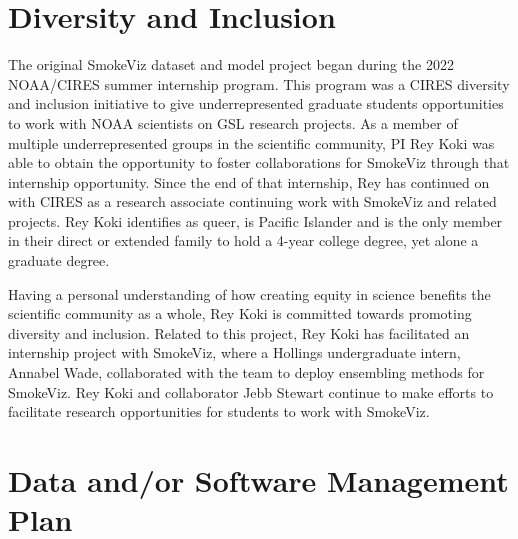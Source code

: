 \section{Diversity and Inclusion}

The original SmokeViz dataset and model project began during the 2022 NOAA/CIRES summer internship program. This program was a CIRES diversity and inclusion initiative to give underrepresented graduate students opportunities to work with NOAA scientists on GSL research projects. As a member of multiple underrepresented groups in the scientific community, PI Rey Koki was able to obtain the opportunity to foster collaborations for SmokeViz through that internship opportunity. Since the end of that internship, Rey has continued on with CIRES as a research associate continuing work with SmokeViz and related projects. Rey Koki identifies as queer, is Pacific Islander and is the only member in their direct or extended family to hold a 4-year college degree, yet alone a graduate degree. 

Having a personal understanding of how creating equity in science benefits the scientific community as a whole, Rey Koki is committed towards promoting diversity and inclusion. Related to this project, Rey Koki has facilitated an internship project with SmokeViz, where a Hollings undergraduate intern, Annabel Wade, collaborated with the team to deploy ensembling methods for SmokeViz. Rey Koki and collaborator Jebb Stewart continue to make efforts to facilitate research opportunities for students to work with SmokeViz.

\section{Data and/or Software Management Plan}


